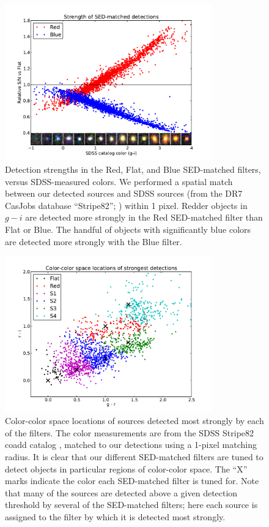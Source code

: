 \documentclass[letterpaper,preprint]{aastex62}
\begin{document}
\begin{figure}
\begin{center}
\includegraphics[width=0.8\textwidth]{mdetect-11}
\caption{Detection strengths in the Red, Flat, and Blue SED-matched
  filters, versus SDSS-measured colors.  We performed a spatial match
  between our detected sources and SDSS sources (from the DR7 CasJobs
  database ``Stripe82''; \cite{annis}) within 1 pixel.  Redder objects
  in $g-i$ are detected more strongly in the Red SED-matched filter
  than Flat or Blue.  The handful of objects with significantly blue
  colors are detected more strongly with the Blue filter.
  \label{fig:redblue}}
\end{center}
\end{figure}


\begin{figure}
\begin{center}
\includegraphics[width=0.8\textwidth]{mdetect-17}
\caption{Color-color space locations of sources detected most strongly
  by each of the filters.
  The color measurements are from the SDSS
  Stripe82 coadd catalog \cite{annis}, matched to
  our detections using a 1-pixel matching radius.
  It is clear that
  our different SED-matched filters are tuned to detect objects in
  particular regions of color-color space.  The ``X'' marks indicate
  the color each SED-matched filter is tuned for.  Note that many of
  the sources are detected above a given detection threshold by
  several of the SED-matched filters; here each source is assigned to
  the filter by which it is detected most strongly.
  \label{fig:colorcolor}}
\end{center}
\end{figure}
\end{document}
